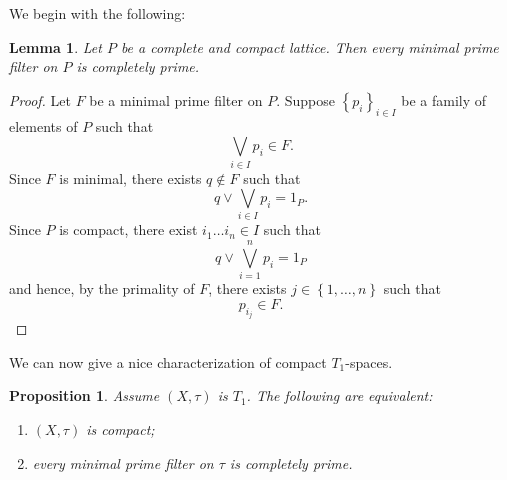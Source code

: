 \documentclass{article}
\theoremstyle{plain}
\newtheorem{proposition}[theorem]{Proposition}
\newtheorem{lemma}[theorem]{Lemma}
\theoremstyle{definition}
\theoremstyle{remark}
\newcommand{\bp}[1]{\left\lbrace #1 \right\rbrace}
\newcommand{\0}{\mathbbm 0}
\newcommand{\1}{\mathbbm 1}
\newcommand{\2}{\mathbbm 2}
\begin{document}
We begin with the following:
\begin{lemma}
\label{lemma:minprimearecompprime}
    Let \(P\) be a complete and compact lattice. Then every minimal prime filter on \(P\) is completely prime. 
\end{lemma}
\begin{proof}
Let \(F\) be a minimal prime filter on \(P\). Suppose \(\bp{p_i}_{i \in I} \) be a family of elements of \(P\) such that\[ \bigvee_{i \in I} p_i \in F.\]
Since \(F\) is minimal, there exists \(q \notin F\) such that
 \[
 q \vee \bigvee_{i \in I} p_i =1_P.
 \]
 Since $P$ is compact, there exist $i_1 \dots i_n \in I$ such that 
 \[
 q \vee \bigvee_{i = 1}^n p_i=1_P
 \] 
and hence, by the primality of \(F\), there exists \(j \in \bp{1,\dots,n}\) such that
 \[
p_{i_j} \in F.
\]
\end{proof}

We can now give a nice characterization of compact $T_1$-spaces.

\begin{proposition}  \label{lem:primecomplprime}
Assume $(X,\tau)$ is $T_1$. The following are equivalent:
\begin{enumerate}
\item \label{lem:primecomplprime-1}
$(X,\tau)$ is compact;
\item \label{lem:primecomplprime-3}
 every minimal prime filter on $\tau$ is completely prime.
\end{enumerate}
\end{proposition}
\end{document}
